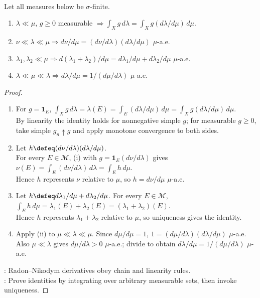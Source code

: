 \begin{proposition} \label{prop:radon-nikodym-change-of-measure-calculus} \\
Let all measures below be $\sigma$-finite.
\begin{enumerate}[label=(\roman*)]
\setlength{\itemsep}{0pt}
\item $\lambda\ll\mu$, $g\geq0$ measurable $\Rightarrow\int_Xg\,d\lambda=\int_Xg(d\lambda/d\mu)\,d\mu$.
\item $\nu\ll\lambda\ll\mu\Rightarrow d\nu/d\mu=(d\nu/d\lambda)(d\lambda/d\mu)$ $\mu$-a.e.
\item $\lambda_1,\lambda_2\ll\mu\Rightarrow d(\lambda_1+\lambda_2)/d\mu=d\lambda_1/d\mu+d\lambda_2/d\mu$ $\mu$-a.e.
\item $\lambda\ll\mu\ll\lambda\Rightarrow d\lambda/d\mu=1/(d\mu/d\lambda)$ $\mu$-a.e.
\end{enumerate}
\begin{proof}
\begin{enumerate}[label=(\roman*)]
\setlength{\itemsep}{0pt}
\item For $g=\mathbf{1}_E$, $\int_Xg\,d\lambda=\lambda(E)=\int_E(d\lambda/d\mu)\,d\mu=\int_Xg(d\lambda/d\mu)\,d\mu$.\\
By linearity the identity holds for nonnegative simple $g$; for measurable $g\geq0$, take simple $g_n\uparrow g$ and apply monotone convergence to both sides.
\item Let $h\defeq(d\nu/d\lambda)(d\lambda/d\mu)$.\\
For every $E\in\mathcal{M}$, (i) with $g=\mathbf{1}_E(d\nu/d\lambda)$ gives $\nu(E)=\int_E(d\nu/d\lambda)\,d\lambda=\int_Eh\,d\mu$.\\
Hence $h$ represents $\nu$ relative to $\mu$, so $h=d\nu/d\mu$ $\mu$-a.e.
\item Let $h\defeq d\lambda_1/d\mu+d\lambda_2/d\mu$. For every $E\in\mathcal{M}$, $\int_Eh\,d\mu=\lambda_1(E)+\lambda_2(E)=(\lambda_1+\lambda_2)(E)$.\\
Hence $h$ represents $\lambda_1+\lambda_2$ relative to $\mu$, so uniqueness gives the identity.
\item Apply (ii) to $\mu\ll\lambda\ll\mu$. Since $d\mu/d\mu=1$, $1=(d\mu/d\lambda)(d\lambda/d\mu)$ $\mu$-a.e.\\
Also $\mu\ll\lambda$ gives $d\mu/d\lambda>0$ $\mu$-a.e.; divide to obtain $d\lambda/d\mu=1/(d\mu/d\lambda)$ $\mu$-a.e.
\end{enumerate}
: Radon--Nikodym derivatives obey chain and linearity rules.\\
: Prove identities by integrating over arbitrary measurable sets, then invoke uniqueness.
\end{proof}
\end{proposition}

